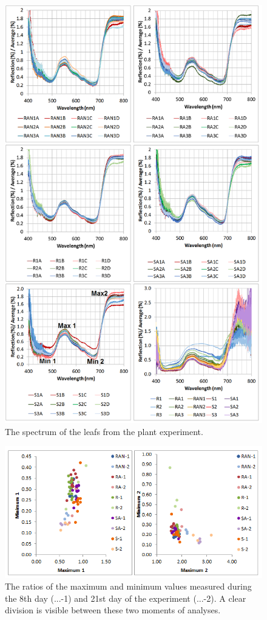 \documentclass[preprint]{elsarticle}
\begin{document}
\begin{figure}
\centering
\includegraphics{img/figure13.png}
\caption{The spectrum of the leafs from the plant experiment.}
\label{fig:f13}
\end{figure}

\begin{figure}
\centering
\includegraphics{img/figure14.png}
\caption{The ratios of the maximum and minimum values measured during the 8th day (...-1) and 21st day of the experiment (...-2). A clear division is visible between these two moments of analyses.}
\label{fig:f14}
\end{figure}
\end{document}
